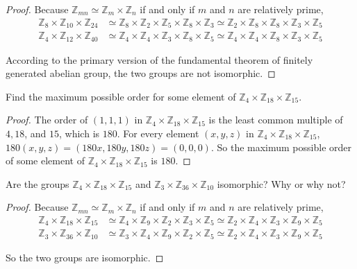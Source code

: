 \begin{proof}
    Because $\mathbb{Z}_{mn}\simeq \mathbb{Z}_{m}\times\mathbb{Z}_{n}$ if and only if $m$ and $n$ are relatively prime,
    \begin{align*}
        \mathbb{Z}_{8}\times\mathbb{Z}_{10}\times\mathbb{Z}_{24} & \simeq \mathbb{Z}_{8}\times\mathbb{Z}_{2}\times\mathbb{Z}_{5}\times\mathbb{Z}_{8}\times\mathbb{Z}_{3} \simeq \mathbb{Z}_{2}\times\mathbb{Z}_{8}\times\mathbb{Z}_{8}\times\mathbb{Z}_{3}\times\mathbb{Z}_{5} \\
        \mathbb{Z}_{4}\times\mathbb{Z}_{12}\times\mathbb{Z}_{40} & \simeq \mathbb{Z}_{4}\times\mathbb{Z}_{4}\times\mathbb{Z}_{3}\times\mathbb{Z}_{8}\times\mathbb{Z}_{5} \simeq \mathbb{Z}_{4}\times\mathbb{Z}_{4}\times\mathbb{Z}_{8}\times\mathbb{Z}_{3}\times\mathbb{Z}_{5}
    \end{align*}

    According to the primary version of the fundamental theorem of finitely generated abelian group, the two groups are not isomorphic.
\end{proof}

\begin{exercise}
    Find the maximum possible order for some element of $\mathbb{Z}_{4}\times\mathbb{Z}_{18}\times\mathbb{Z}_{15}$.
\end{exercise}

\begin{proof}
    The order of $(1,1,1)$ in $\mathbb{Z}_{4}\times\mathbb{Z}_{18}\times\mathbb{Z}_{15}$ is the least common multiple of $4,18$, and $15$, which is $180$. For every element $(x,y,z)$ in $\mathbb{Z}_{4}\times\mathbb{Z}_{18}\times\mathbb{Z}_{15}$, $180(x,y,z) = (180x,180y,180z) = (0,0,0)$. So the maximum possible order of some element of $\mathbb{Z}_{4}\times\mathbb{Z}_{18}\times\mathbb{Z}_{15}$ is $180$.
\end{proof}

\begin{exercise}
    Are the groups $\mathbb{Z}_{4}\times\mathbb{Z}_{18}\times\mathbb{Z}_{15}$ and $\mathbb{Z}_{3}\times\mathbb{Z}_{36}\times\mathbb{Z}_{10}$ isomorphic? Why or why not?
\end{exercise}

\begin{proof}
    Because $\mathbb{Z}_{mn}\simeq \mathbb{Z}_{m}\times\mathbb{Z}_{n}$ if and only if $m$ and $n$ are relatively prime,
    \begin{align*}
        \mathbb{Z}_{4}\times\mathbb{Z}_{18}\times\mathbb{Z}_{15} & \simeq \mathbb{Z}_{4}\times\mathbb{Z}_{9}\times\mathbb{Z}_{2}\times\mathbb{Z}_{3}\times\mathbb{Z}_{5} \simeq \mathbb{Z}_{2}\times\mathbb{Z}_{4}\times\mathbb{Z}_{3}\times\mathbb{Z}_{9}\times\mathbb{Z}_{5}  \\
        \mathbb{Z}_{3}\times\mathbb{Z}_{36}\times\mathbb{Z}_{10} & \simeq \mathbb{Z}_{3}\times\mathbb{Z}_{4}\times\mathbb{Z}_{9}\times\mathbb{Z}_{2}\times\mathbb{Z}_{5} \simeq \mathbb{Z}_{2}\times \mathbb{Z}_{4}\times\mathbb{Z}_{3}\times\mathbb{Z}_{9}\times\mathbb{Z}_{5}
    \end{align*}

    So the two groups are isomorphic.
\end{proof}

